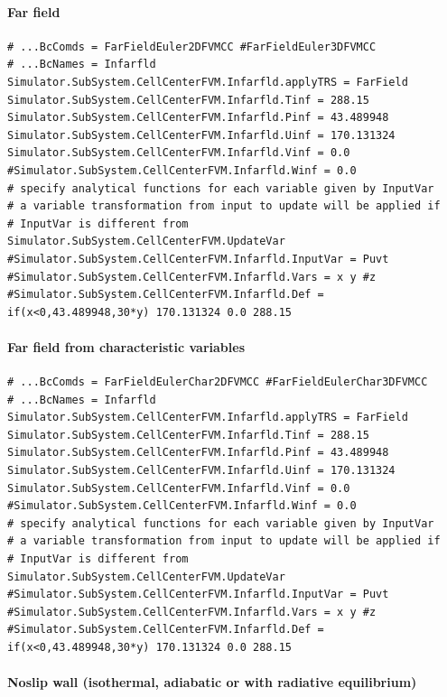 \documentclass[11pt]{article}
\begin{document}
\paragraph{Far field}

\begin{lstlisting}[breaklines]
# ...BcComds = FarFieldEuler2DFVMCC #FarFieldEuler3DFVMCC
# ...BcNames = Infarfld
Simulator.SubSystem.CellCenterFVM.Infarfld.applyTRS = FarField
Simulator.SubSystem.CellCenterFVM.Infarfld.Tinf = 288.15
Simulator.SubSystem.CellCenterFVM.Infarfld.Pinf = 43.489948
Simulator.SubSystem.CellCenterFVM.Infarfld.Uinf = 170.131324
Simulator.SubSystem.CellCenterFVM.Infarfld.Vinf = 0.0
#Simulator.SubSystem.CellCenterFVM.Infarfld.Winf = 0.0
# specify analytical functions for each variable given by InputVar
# a variable transformation from input to update will be applied if 
# InputVar is different from Simulator.SubSystem.CellCenterFVM.UpdateVar 
#Simulator.SubSystem.CellCenterFVM.Infarfld.InputVar = Puvt
#Simulator.SubSystem.CellCenterFVM.Infarfld.Vars = x y #z
#Simulator.SubSystem.CellCenterFVM.Infarfld.Def = if(x<0,43.489948,30*y) 170.131324 0.0 288.15
\end{lstlisting}

\paragraph{Far field from characteristic variables}

\begin{lstlisting}[breaklines]
# ...BcComds = FarFieldEulerChar2DFVMCC #FarFieldEulerChar3DFVMCC
# ...BcNames = Infarfld
Simulator.SubSystem.CellCenterFVM.Infarfld.applyTRS = FarField
Simulator.SubSystem.CellCenterFVM.Infarfld.Tinf = 288.15
Simulator.SubSystem.CellCenterFVM.Infarfld.Pinf = 43.489948
Simulator.SubSystem.CellCenterFVM.Infarfld.Uinf = 170.131324
Simulator.SubSystem.CellCenterFVM.Infarfld.Vinf = 0.0
#Simulator.SubSystem.CellCenterFVM.Infarfld.Winf = 0.0
# specify analytical functions for each variable given by InputVar
# a variable transformation from input to update will be applied if 
# InputVar is different from Simulator.SubSystem.CellCenterFVM.UpdateVar 
#Simulator.SubSystem.CellCenterFVM.Infarfld.InputVar = Puvt
#Simulator.SubSystem.CellCenterFVM.Infarfld.Vars = x y #z
#Simulator.SubSystem.CellCenterFVM.Infarfld.Def = if(x<0,43.489948,30*y) 170.131324 0.0 288.15
\end{lstlisting}

\paragraph{Noslip wall (isothermal, adiabatic or with radiative equilibrium)}
\end{document}

